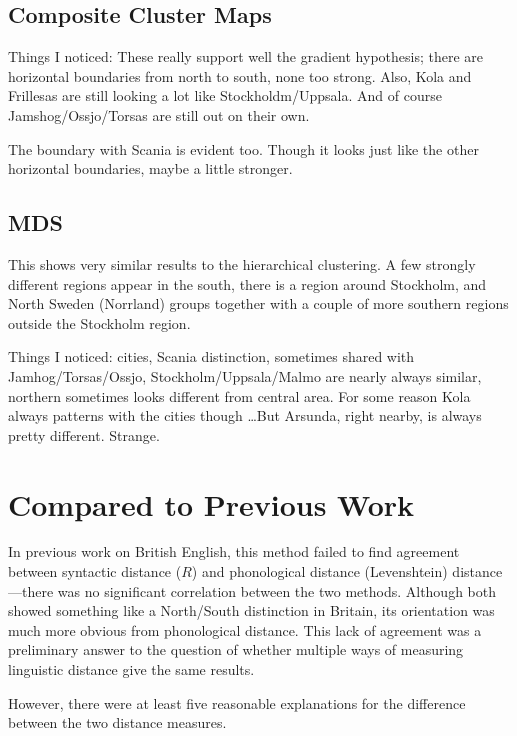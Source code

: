 \subsection{Composite Cluster Maps}

Things I noticed: These really support well the gradient hypothesis;
there are horizontal boundaries from north to south, none too
strong. Also, Kola and Frillesas are still looking a lot like
Stockholdm/Uppsala. And of course Jamshog/Ossjo/Torsas are still out
on their own.

The boundary with Scania is evident too. Though it looks just like the
other horizontal boundaries, maybe a little stronger.

\subsection{MDS}

This shows very similar results to the hierarchical clustering. A
few strongly different regions appear in the south, there is a region
around Stockholm, and North Sweden (Norrland) groups together with a
couple of more southern regions outside the Stockholm region.

Things I noticed: cities, Scania distinction, sometimes shared with
Jamhog/Torsas/Ossjo, Stockholm/Uppsala/Malmo are nearly always
similar, northern sometimes looks different from central area. For
some reason Kola always patterns with the cities though \ldots But
Arsunda, right nearby, is always pretty different. Strange.

\section{Compared to Previous Work}

In previous work on British English, this method failed to find
agreement between syntactic distance ($R$) and phonological distance
(Levenshtein) distance---there was no
significant correlation between the two methods. Although both showed
something like a North/South distinction in Britain, its orientation was much more
obvious from phonological distance. This lack of agreement was a
preliminary answer to the question of whether multiple
ways of measuring linguistic distance give the same results.

However, there were at least five reasonable explanations for the difference
between the two distance measures.

